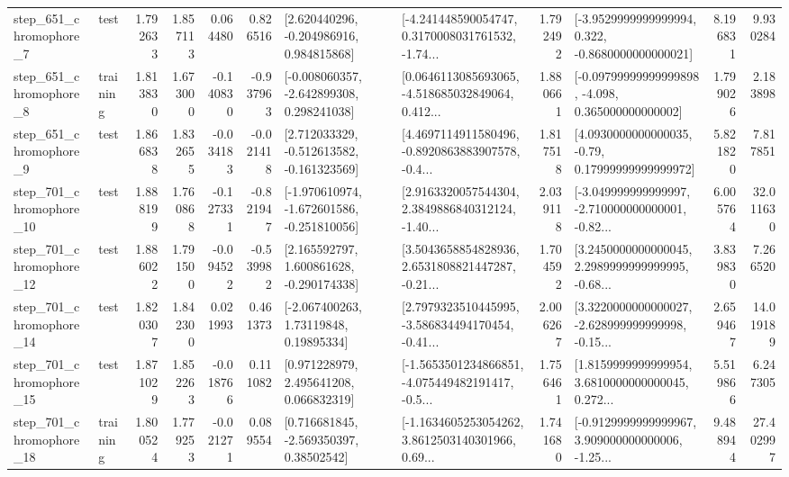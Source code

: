 \begin{tabular}{llrrrrllrlrr}
   step\_651\_chromophore\_7 &      test &      1.792633 &    1.857113 &      0.064480 &  0.826516 &    [2.620440296, -0.204986916, 0.984815868] &  [-4.241448590054747, 0.3170008031761532, -1.74... &       1.792492 &  [-3.9529999999999994, 0.322, -0.8680000000000021] &            8.196831 &          9.930284 \\
   step\_651\_chromophore\_8 &  training &      1.813830 &    1.673000 &     -0.140830 & -0.937963 &   [-0.008060357, -2.642899308, 0.298241038] &  [0.0646113085693065, -4.518685032849064, 0.412... &       1.880661 &  [-0.09799999999999898, -4.098, 0.365000000000002] &            1.799026 &          2.183898 \\
   step\_651\_chromophore\_9 &      test &      1.866838 &    1.832655 &     -0.034183 & -0.021418 &   [2.712033329, -0.512613582, -0.161323569] &  [4.4697114911580496, -0.8920863883907578, -0.4... &       1.817518 &   [4.0930000000000035, -0.79, 0.17999999999999972] &            5.821820 &          7.817851 \\
  step\_701\_chromophore\_10 &      test &      1.888199 &    1.760868 &     -0.127331 & -0.821947 &  [-1.970610974, -1.672601586, -0.251810056] &  [2.9163320057544304, 2.3849886840312124, -1.40... &       2.039118 &  [-3.049999999999997, -2.710000000000001, -0.82... &            6.005764 &         32.011630 \\
  step\_701\_chromophore\_12 &      test &      1.886022 &    1.791500 &     -0.094522 & -0.539982 &    [2.165592797, 1.600861628, -0.290174338] &  [3.5043658854828936, 2.6531808821447287, -0.21... &       1.704592 &  [3.2450000000000045, 2.2989999999999995, -0.68... &            3.839830 &          7.266520 \\
  step\_701\_chromophore\_14 &      test &      1.820307 &    1.842300 &      0.021993 &  0.461373 &      [-2.067400263, 1.73119848, 0.19895334] &  [2.7979323510445995, -3.586834494170454, -0.41... &       2.006267 &  [3.3220000000000027, -2.628999999999998, -0.15... &            2.659467 &         14.019189 \\
  step\_701\_chromophore\_15 &      test &      1.871029 &    1.852263 &     -0.018766 &  0.111082 &     [0.971228979, 2.495641208, 0.066832319] &  [-1.5653501234866851, -4.075449482191417, -0.5... &       1.756461 &  [1.8159999999999954, 3.6810000000000045, 0.272... &            5.519866 &          6.247305 \\
  step\_701\_chromophore\_18 &  training &      1.800524 &    1.779253 &     -0.021271 &  0.089554 &     [0.716681845, -2.569350397, 0.38502542] &  [-1.1634605253054262, 3.8612503140301966, 0.69... &       1.741680 &  [-0.9129999999999967, 3.909000000000006, -1.25... &            9.488944 &         27.402997 \\

\end{tabular}
